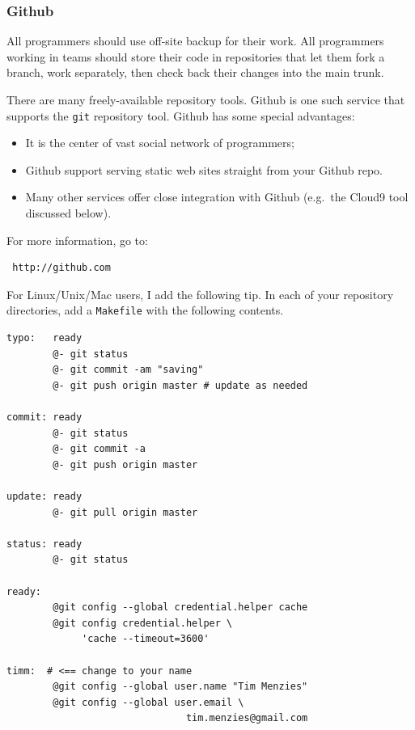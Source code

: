 \subsubsection{Github}\label{github}

All programmers should use off-site backup for their work. All
programmers working in teams should store their code in repositories
that let them fork a branch, work separately, then check back their
changes into the main trunk.

There are many freely-available repository tools. Github is one such
service that supports the \texttt{git} repository tool. Github has some
special advantages:

\begin{itemize}
\itemsep1pt\parskip0pt
\item
  It is the center of vast social network of programmers;
\item
  Github support serving static web sites straight from your Github
  repo.
\item
  Many other services offer close integration with Github (e.g.~the
  Cloud9 tool discussed below).
\end{itemize}

For more information, go to:

\begin{lstlisting}
 http://github.com
\end{lstlisting}

For Linux/Unix/Mac users, I add the following tip. In each of your
repository directories, add a \texttt{Makefile} with the following
contents.

\begin{lstlisting}
typo:   ready
        @- git status
        @- git commit -am "saving"
        @- git push origin master # update as needed

commit: ready
        @- git status
        @- git commit -a
        @- git push origin master

update: ready
        @- git pull origin master

status: ready
        @- git status

ready:
        @git config --global credential.helper cache
        @git config credential.helper \
             'cache --timeout=3600'

timm:  # <== change to your name
        @git config --global user.name "Tim Menzies"
        @git config --global user.email \
                               tim.menzies@gmail.com
\end{lstlisting}

